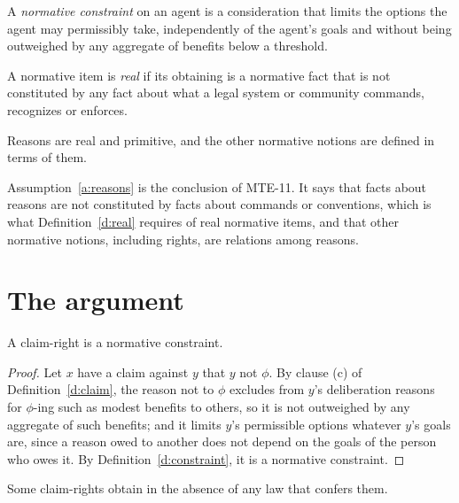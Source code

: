 \documentclass{situationist-preprint}
\begin{document}
\begin{definition}\label{d:constraint}
A \emph{normative constraint} on an agent is a consideration that limits the options the agent may permissibly take, independently of the agent's goals and without being outweighed by any aggregate of benefits below a threshold.
\end{definition}

\begin{definition}[Reality]\label{d:real}
A normative item is \emph{real} if its obtaining is a normative fact that is not constituted by any fact about what a legal system or community commands, recognizes or enforces.
\end{definition}

\begin{assumption}\label{a:reasons}
Reasons are real and primitive, and the other normative notions are defined in terms of them.
\end{assumption}

Assumption~\ref{a:reasons} is the conclusion of MTE-11. It says that facts about reasons are not constituted by facts about commands or conventions, which is what Definition~\ref{d:real} requires of real normative items, and that other normative notions, including rights, are relations among reasons.

\section{The argument}

\begin{lemma}\label{l:structure}
A claim-right is a normative constraint.
\end{lemma}

\begin{proof}
Let $x$ have a claim against $y$ that $y$ not $\phi$. By clause (c) of Definition~\ref{d:claim}, the reason not to $\phi$ excludes from $y$'s deliberation reasons for $\phi$-ing such as modest benefits to others, so it is not outweighed by any aggregate of such benefits; and it limits $y$'s permissible options whatever $y$'s goals are, since a reason owed to another does not depend on the goals of the person who owes it. By Definition~\ref{d:constraint}, it is a normative constraint.
\end{proof}

\begin{lemma}\label{l:indep}
Some claim-rights obtain in the absence of any law that confers them.
\end{lemma}
\end{document}
